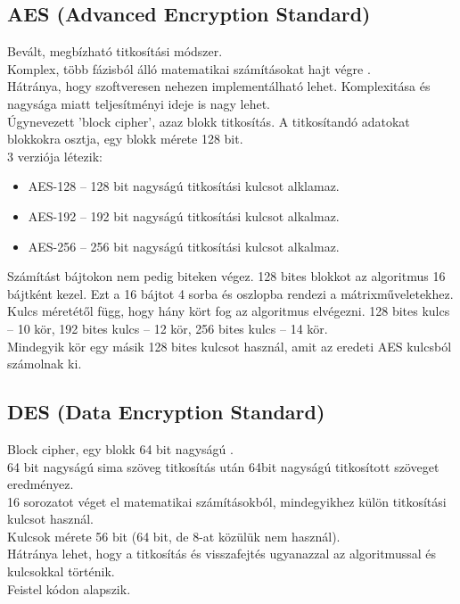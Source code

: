 \subsection{AES (Advanced Encryption Standard)}
\noindent Bevált, megbízható titkosítási módszer. 
\vspace{5pt}\\Komplex, több fázisból álló matematikai számításokat hajt végre \cite{nechvatal2001report}.
\vspace{5pt}\\Hátránya, hogy szoftveresen nehezen implementálható lehet. Komplexitása és nagysága miatt teljesítményi ideje is nagy lehet.
\vspace{5pt}\\Úgynevezett 'block cipher', azaz blokk titkosítás. A titkosítandó adatokat blokkokra osztja, egy blokk mérete 128 bit.
\vspace{5pt}\\3 verziója létezik:
\begin{itemize}
	\item AES-128 – 128 bit nagyságú titkosítási kulcsot alklamaz.
	\item AES-192 – 192 bit nagyságú titkosítási kulcsot alkalmaz.
	\item AES-256 – 256 bit nagyságú titkosítási kulcsot alkalmaz.
\end{itemize}
\vspace{5pt}Számítást bájtokon nem pedig biteken végez. 128 bites blokkot az algoritmus 16 bájtként kezel. Ezt a 16 bájtot 4 sorba és oszlopba rendezi a mátrixműveletekhez.
\vspace{5pt}\\Kulcs méretétől függ, hogy hány kört fog az algoritmus elvégezni. 128 bites kulcs – 10 kör, 192 bites kulcs – 12 kör, 256 bites kulcs – 14 kör.
\vspace{5pt}\\Mindegyik kör egy másik 128 bites kulcsot használ, amit az eredeti AES kulcsból számolnak ki.



\subsection{DES (Data Encryption Standard)}
\noindent Block cipher, egy blokk 64 bit nagyságú \cite{standard1999data}.
\vspace{5pt}\\64 bit nagyságú sima szöveg titkosítás után 64bit nagyságú titkosított szöveget eredményez.
\vspace{5pt}\\16 sorozatot véget el matematikai számításokból, mindegyikhez külön titkosítási kulcsot használ.
\vspace{5pt}\\Kulcsok mérete 56 bit (64 bit, de 8-at közülük nem használ).
\vspace{5pt}\\Hátránya lehet, hogy a titkosítás és visszafejtés ugyanazzal az algoritmussal és kulcsokkal történik.
\vspace{5pt}\\Feistel kódon alapszik.



